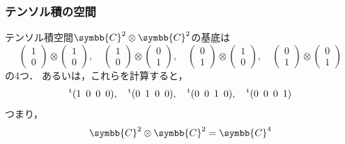 \documentclass[
    10pt,
    ]{sotsu-beamer}
\begin{document}
\begin{frame}
    \frametitle{テンソル積の空間}

    テンソル積空間$\symbb{C}^2 \otimes \symbb{C}^2$の基底は
    \begin{equation*}
        \begin{pmatrix}
            1  \\  0
        \end{pmatrix}
        \otimes 
        \begin{pmatrix}
            1  \\  0
        \end{pmatrix}
        , 
        \quad 
        \begin{pmatrix}
            1  \\  0
        \end{pmatrix}
        \otimes 
        \begin{pmatrix}
            0  \\  1
        \end{pmatrix}
        , 
        \quad 
        \begin{pmatrix}
            0  \\  1
        \end{pmatrix}
        \otimes 
        \begin{pmatrix}
            1  \\  0
        \end{pmatrix}
        , 
        \quad 
        \begin{pmatrix}
            0  \\  1
        \end{pmatrix}
        \otimes 
        \begin{pmatrix}
            0  \\  1
        \end{pmatrix}        
    \end{equation*}
    の4つ．
    あるいは，これらを計算すると，
    \begin{equation*}
        \cvector{1 ; 0 ; 0 ; 0},
        \quad 
        \cvector{0 ; 1 ; 0 ; 0},
        \quad 
        \cvector{0 ; 0 ; 1 ; 0},
        \quad 
        \cvector{0 ; 0 ; 0 ; 1}
    \end{equation*}
    つまり，
    \begin{equation*}
        \symbb{C}^2 \otimes \symbb{C}^2 = \symbb{C}^4
    \end{equation*}

\end{frame}
\end{document}
